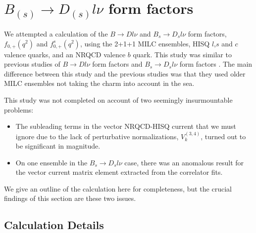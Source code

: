 \section{$B_{(s)}\to D_{(s)}l\nu$ form factors}
\label{sec:BD_BsDs_nrqcd}

We attempted a calculation of the $B\to Dl\nu$ and $B_{s}\to D_{s}l\nu$ form factors, $f_{0,+}(q^2)$ and $f^s_{0,+}(q^2)$, using the 2+1+1 MILC ensembles, HISQ $l$,$s$ and $c$ valence quarks, and an NRQCD valence $b$ quark. This study was similar to previous studies of $B\to Dl\nu$ form factors \cite{Na:2015kha} and $B_s\to D_sl\nu$ form factors \cite{Monahan:2017uby}. The main difference between this study and the previous studies was that they used older MILC ensembles not taking the charm into account in the sea.

This study was not completed on account of two seemingly insurmountable problems:
\begin{itemize}
  \item
    The subleading terms in the vector NRQCD-HISQ current that we must ignore due to the lack of perturbative normalizations, $V_{k}^{(3,4)}$, turned out to be significant in magnitude.
  \item
    On one ensemble in the $B_s\to D_s l\nu$ case, there was an anomalous result for the vector current matrix element extracted from the correlator fits.
\end{itemize}
We give an outline of the calculation here for completeness, but the crucial findings of this section are these two issues.

\subsection{Calculation Details}

